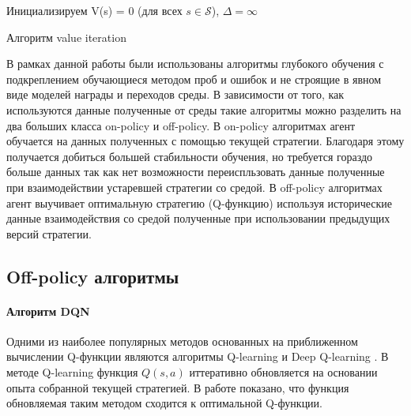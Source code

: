\begin{algorithm}[ht]
	\SetAlgoLined
	Инициализируем V(s) = 0 (для всех $s \in \mathcal{S}$), $\Delta = \infty$\;
	\caption{Алгоритм value iteration}
	\label{alg:value_it}

\end{algorithm}

В рамках данной работы были использованы алгоритмы глубокого обучения с подкреплением обучающиеся методом проб и ошибок и не строящие в явном виде моделей награды и переходов среды. В зависимости от того, как используются данные полученные от среды такие алгоритмы можно разделить на два больших класса on-policy и off-policy. В on-policy алгоритмах агент обучается на данных полученных с помощью текущей стратегии. Благодаря этому получается добиться большей стабильности обучения, но требуется гораздо больше данных так как нет возможности переиспльзовать данные полученные при взаимодействии устаревшей стратегии со средой. 
В off-policy алгоритмах агент выучивает оптимальную стратегию (Q-функцию) используя исторические данные взаимодействия со средой полученные при использовании предыдущих версий стратегии. 

\subsection{Off-policy алгоритмы}

\paragraph{Алгоритм DQN}

Одними из наиболее популярных методов основанных на приближенном вычислении Q-функции являются алгоритмы Q-learning \cite{Watkins_1992} и Deep Q-learning \cite{mnih2013atari}. В методе Q-learning функция $Q(s, a)$ иттеративно обновляется на основании опыта собранной текущей стратегией. В работе \cite{SuttonQLearning} показано, что функция обновляемая таким методом сходится к оптимальной Q-функции.

